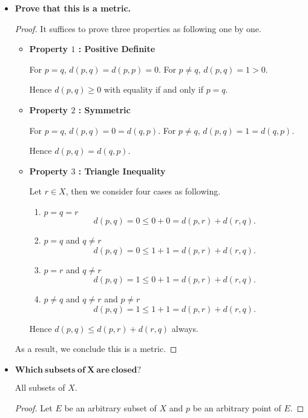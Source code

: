\begin{Exercise}
	\begin{itemize}
		\item \textbf{Prove that this is a metric.}
		\begin{proof}
			It suffices to prove three properties as following one by one.
			\begin{itemize}
				\item \textbf{Property $1$ : Positive Definite}
				
				For $p=q$, $d(p,q) = d(p,p) = 0$. For $p\neq q$, $d(p,q) = 1 > 0$.
				
				Hence $d(p,q)\geq 0$ with equality if and only if $p=q$.
				
				\item \textbf{Property $2$ : Symmetric}
				
				For $p=q$, $d(p,q) = 0 = d(q,p)$. For $p\neq q$, $d(p,q) = 1 = d(q,p)$.
				
				Hence $d(p,q) = d(q,p)$.
				
				\item \textbf{Property $3$ : Triangle Inequality}
				
				Let $r\in X$, then we consider four cases as following.
				
				\begin{enumerate}
					\item $p=q=r$
					$$
					d(p,q) = 0 \leq 0 + 0 = d(p,r) + d(r,q).
					$$
					
					\item $p=q$ and $q\neq r$
					$$
					d(p,q) = 0 \leq 1 + 1 = d(p,r) + d(r,q).
					$$
					
					\item $p=r$ and $q\neq r$
					$$
					d(p,q) = 1 \leq 0 + 1 = d(p,r) + d(r,q).
					$$
					
					\item $p\neq q$ and $q\neq r$ and $p \neq r$
					$$
					d(p,q) = 1 \leq 1 + 1 = d(p,r) + d(r,q).
					$$
				\end{enumerate}
				
				Hence $d(p,q) \leq d(p,r) + d(r,q)$ always.
			\end{itemize}
			
			As a result, we conclude this is a metric.
		\end{proof}
		
		\item $\mathbf{Which\ subsets\ of\ X\ are\ closed?}$
		\begin{answer}
			All subsets of $X$.
		\end{answer}
		\begin{proof}
			Let $E$ be an arbitrary subset of $X$ and $p$ be an arbitrary point of $E$. 
			

\end{proof}
\end{itemize}
\end{Exercise}

